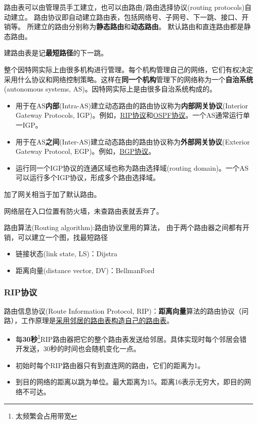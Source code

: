 路由表可以由管理员手工建立，也可以由路由/路由选择协议(routing protocols)自动建立。
路由协议即自动建立路由表，包括网络号、子网号、下一跳、接口、开销等。
所建立的路由分别称为\textbf{静态路由}和\textbf{动态路由}。
默认路由和直连路由都是静态路由。

建路由表是记\textbf{最短路径}的下一跳。

整个因特网实际上由很多机构进行管理。每个机构管理自己的网络，它们有权决定采用什么协议和网络控制策略。这样在\textbf{同一个机构}管理下的网络称为一个\textbf{自治系统}(autonomous systems, AS)。因特网实际上是由很多自治系统构成的。
\begin{itemize}
	\item 用于在AS\textbf{内部}(Intra-AS)建立动态路由的路由协议称为\textbf{内部网关协议}(Interior Gateway Protocols, IGP)。例如，\underline{RIP协议}和\underline{OSPF协议}。一个AS通常运行单一IGP。
	\item 用于在AS\textbf{之间}(Inter-AS)建立动态路由的路由协议称为\textbf{外部网关协议}(Exterior Gateway Protocol, EGP)。例如，\underline{BGP协议}。
	\item 运行同一个IGP协议的连通区域也称为路由选择域(routing domain)。一个AS可以运行多个IGP协议，形成多个路由选择域。
\end{itemize}

加了网关相当于加了默认路由。

网络层在入口位置有防火墙，未查路由表就丢弃了。

路由算法(Routing algorithm):路由协议里用的算法， 由于两个路由器之间都有开销，可以建立一个图，找最短路径
\begin{itemize}
	\item 链接状态(link state, LS)：Dijstra
	\item 距离向量(distance vector, DV)：BellmanFord
\end{itemize}

\subsubsection{RIP协议}
路由信息协议(Route Information Protocol, RIP)：\textbf{距离向量}算法的路由协议（问路），工作原理是\underline{采用邻居的路由表构造自己的路由表}。
\begin{itemize}
	\item 每\textbf{30秒}\footnote{太频繁会占用带宽}RIP路由器把它的整个路由表发送给邻居。具体实现时每个邻居会错开发送，30秒的时间也会随机变化一点。
	\item 初始时每个RIP路由器只有到直连网的路由，它们的距离为1。
	\item 到目的网络的距离以跳为单位。最大距离为15。距离16表示无穷大，即目的网络不可达。
\end{itemize}


